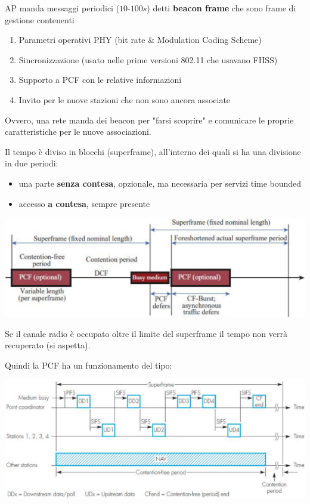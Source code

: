 AP manda messaggi periodici ($10$-$100s$) detti \textbf{beacon frame} che sono frame di gestione contenenti
\begin{enumerate}
	\item Parametri operativi PHY (bit rate \& Modulation Coding Scheme)

	\item Sincronizzazione (usato nelle prime versioni 802.11 che usavano FHSS)

	\item Supporto a PCF con le relative informazioni

	\item Invito per le nuove stazioni che non sono ancora associate
\end{enumerate}
Ovvero, una rete manda dei beacon per "farsi scoprire" e comunicare le proprie caratteristiche per le nuove associazioni.

Il tempo è diviso in blocchi (superframe), all'interno dei quali si ha una divisione in due periodi:
\begin{itemize}
	\item una parte \textbf{senza contesa}, opzionale, ma necessaria per servizi time bounded
    
	\item accesso \textbf{a contesa}, sempre presente
\end{itemize}
\begin{center}
	\includegraphics[width=0.95\linewidth]{img/wlan/superframe}
\end{center}

Se il canale radio è occupato oltre il limite del superframe il tempo non verrà recuperato (si aspetta).

Quindi la PCF ha un funzionamento del tipo:
\begin{center}
	\includegraphics[width=0.98\linewidth]{img/wlan/pcf1}
\end{center}

